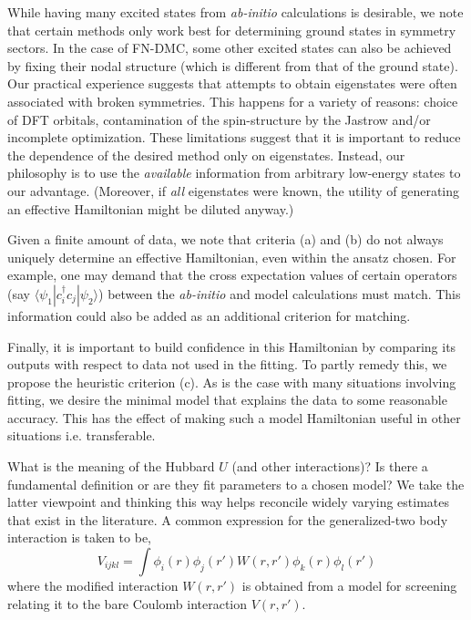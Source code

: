 \documentclass[prl,12pt,onecolumn,nofootinbib,notitlepage,english,superscriptaddress]{revtex4-1}
\newcommand{\HJC}[1]{{\color{RED}{\bf HJC: #1}}}
\begin{document}
While having many excited states from \emph{ab-initio} calculations 
is desirable, we note that certain methods only work best for 
determining ground states in symmetry sectors. 
In the case of FN-DMC, 
some other excited states can also be achieved by fixing their 
nodal structure (which is different from that of the ground state). 
Our practical experience suggests that attempts to obtain 
eigenstates were often associated with broken symmetries. 
This happens for a variety of reasons: choice of DFT orbitals, 
contamination of the spin-structure by the 
Jastrow and/or incomplete optimization. 
These limitations suggest that it is 
important to reduce the dependence of the desired 
method only on eigenstates. Instead, our philosophy is to 
use the \emph{available} information from arbitrary 
low-energy states to our advantage. 
(Moreover, if \emph{all} eigenstates were known, the utility of 
generating an effective Hamiltonian might be diluted anyway.)
  
Given a finite amount of data, we note that criteria (a) and (b) 
do not always uniquely determine an effective Hamiltonian, 
even within the ansatz chosen. For example, one may demand that 
the cross expectation values of certain operators 
(say $\langle \psi_1 | c_i^{\dagger} c_j | \psi_2 \rangle$) 
between the \emph{ab-initio} and model calculations must match. 
This information could also be added as an 
additional criterion for matching. 

\HJC{Importance of transferability}
Finally, it is important to build confidence 
in this Hamiltonian by comparing its outputs with respect 
to data not used in the fitting. 
To partly remedy this, we propose the 
heuristic criterion (c). As is the case with many situations 
involving fitting, we desire 
the minimal model that explains the data to 
some reasonable accuracy. This has the effect of making such a 
model Hamiltonian useful in other situations i.e. transferable.

\HJC{Hubbard parameters are fit parameters, do not have any deep meaning necessarily.}
What is the meaning of the Hubbard $U$ (and other interactions)?
Is there a fundamental definition or are they fit parameters to a chosen model? 
We take the latter viewpoint and thinking this way helps reconcile 
widely varying estimates that exist in the literature. 
A common expression for the generalized-two body interaction is taken to be, 
\begin{equation}
 V_{ijkl} = \int  \phi_i (r) \phi_j (r')  W (r,r') \phi_k (r) \phi_l (r')
\end{equation}
where the modified interaction $W(r,r')$ is obtained from a model for screening 
relating it to the bare Coulomb interaction $V(r,r')$. 
\end{document}
